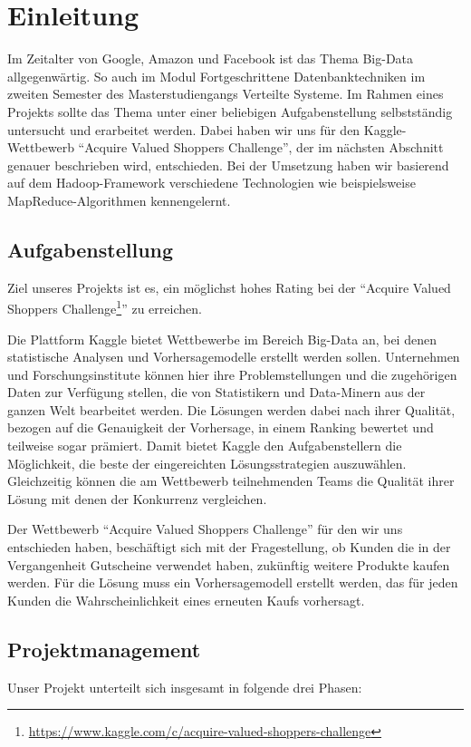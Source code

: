 \section{Einleitung}
Im Zeitalter von Google, Amazon und Facebook ist das Thema Big-Data allgegenwärtig. So auch im Modul Fortgeschrittene Datenbanktechniken im zweiten Semester des Masterstudiengangs Verteilte Systeme. Im Rahmen eines Projekts sollte das Thema unter einer beliebigen Aufgabenstellung selbstständig untersucht und erarbeitet werden. Dabei haben wir uns für den Kaggle-Wettbewerb "`Acquire Valued Shoppers Challenge"', der im nächsten Abschnitt genauer beschrieben wird, entschieden. Bei der Umsetzung haben wir basierend auf dem Hadoop-Framework verschiedene Technologien wie beispielsweise MapReduce-Algorithmen kennengelernt.

\subsection{Aufgabenstellung}
Ziel unseres Projekts ist es, ein möglichst hohes Rating bei der "`Acquire Valued Shoppers Challenge\footnote{\url{https://www.kaggle.com/c/acquire-valued-shoppers-challenge}}"' zu erreichen.

Die Plattform Kaggle bietet Wettbewerbe im Bereich Big-Data an, bei denen statistische Analysen und Vorhersagemodelle erstellt werden sollen. Unternehmen und Forschungsinstitute können hier ihre Problemstellungen und die zugehörigen Daten zur Verfügung stellen, die von Statistikern und Data-Minern aus der ganzen Welt bearbeitet werden. Die Lösungen werden dabei nach ihrer Qualität, bezogen auf die Genauigkeit der Vorhersage, in einem Ranking bewertet und teilweise sogar prämiert. Damit bietet Kaggle den Aufgabenstellern die Möglichkeit, die beste der eingereichten Lösungsstrategien auszuwählen. Gleichzeitig können die am Wettbewerb teilnehmenden Teams die Qualität ihrer Lösung mit denen der Konkurrenz vergleichen.

Der Wettbewerb "`Acquire Valued Shoppers Challenge"' für den wir uns entschieden haben, beschäftigt sich mit der Fragestellung, ob Kunden die in der Vergangenheit Gutscheine verwendet haben, zukünftig weitere Produkte kaufen werden. Für die Lösung muss ein Vorhersagemodell erstellt werden, das für jeden Kunden die Wahrscheinlichkeit eines erneuten Kaufs vorhersagt. 

\newpage
\subsection{Projektmanagement}
Unser Projekt unterteilt sich insgesamt in folgende drei Phasen:

